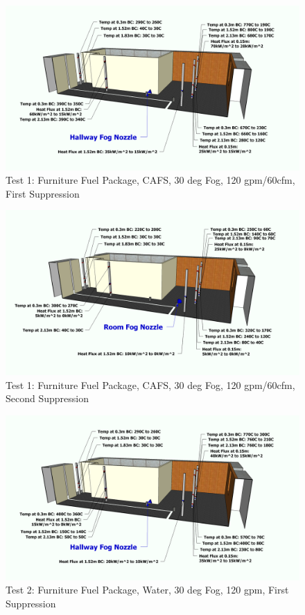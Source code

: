 \documentclass[12pt,oneside]{book}
\begin{document}
\begin{figure}[!ht]
	\includegraphics[width=6in]{../Figures/Pictures/Metric/DelCoFogTest1FirstSuppression}
	\caption{Test 1: Furniture Fuel Package, CAFS, 30 deg Fog, 120 gpm/60cfm, First Suppression}
	\label{fig:Test_1_First_Suppression}
\end{figure}

\begin{figure}[!ht]
	\includegraphics[width=6in]{../Figures/Pictures/Metric/DelCoFogTest1SecondSuppression}
	\caption{Test 1: Furniture Fuel Package, CAFS, 30 deg Fog, 120 gpm/60cfm, Second Suppression}
	\label{fig:Test_1_Second_Suppression}
\end{figure}

\begin{figure}[!ht]
	\includegraphics[width=6in]{../Figures/Pictures/Metric/DelCoFogTest2FirstSuppression}
	\caption{Test 2: Furniture Fuel Package, Water, 30 deg Fog, 120 gpm, First Suppression}
	\label{fig:Test_2_First_Suppression}
\end{figure}
\end{document}
